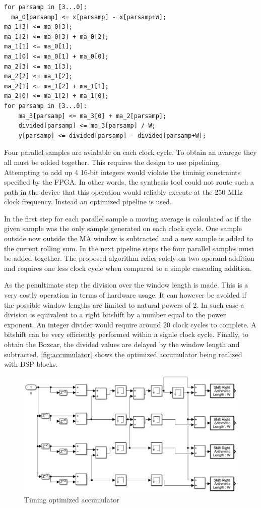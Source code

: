\begin{lstlisting}
for parsamp in [3...0]:
  ma_0[parsamp] <= x[parsamp] - x[parsamp+W];
ma_1[3] <= ma_0[3];
ma_1[2] <= ma_0[3] + ma_0[2];
ma_1[1] <= ma_0[1];
ma_1[0] <= ma_0[1] + ma_0[0];
ma_2[3] <= ma_1[3];
ma_2[2] <= ma_1[2];
ma_2[1] <= ma_1[2] + ma_1[1];
ma_2[0] <= ma_1[2] + ma_1[0];
for parsamp in [3...0]:
	ma_3[parsamp] <= ma_3[0] + ma_2[parsamp];
	divided[parsamp] <= ma_3[parsamp] / W;
	y[parsamp] <= divided[parsamp] - divided[parsamp+W];
\end{lstlisting}


Four parallel samples are avialable on each clock cycle. To obtain
an avarege they all must be added together. This requires the design
to use pipelining. Attempting to add up 4 16-bit integers would
violate the timinig constraints specified by the FPGA. In other words,
the synthesis tool could not route such a path in the device
that this operation would reliably execute at the 250 MHz clock frequency.
Instead an optimized pipeline is used. 


In the first step for each parallel sample a moving average is calculated
as if the given sample was the only sample generated on each clock cycle. 
One sample outside now outside the MA window is subtracted and a new sample
is added to the current rolling sum. In the next pipeline steps 
the four parallel samples must be added together. The proposed algorithm
relies solely on two operand addition and requires one less clock cycle
when compared to a simple cascading addition. 


As the penultimate step the division over the window length is made.
This is a very costly operation in terms of hardware usage.
It can however be avoided if the possible window lengths are limited to 
natural powers of 2. In such case a division is equivalent to a  
right bitshift by a number equal to the power exponent.
An integer divider would require around 20 clock cycles to complete.
A bitshift can be very efficiently performed within a signle clock cycle.
Finally, to obtain the Boxcar, the divided values are delayed by the
window length and subtracted. \autoref{fig:accumulator} shows
the optimized accumulator being realized with DSP blocks.

\begin{figure}[H]
  \centering
  \includegraphics[width=\linewidth]{media/accumulator.png}
  \caption{Timing optimized accumulator}
  \label{fig:accumulator} 
\end{figure}

